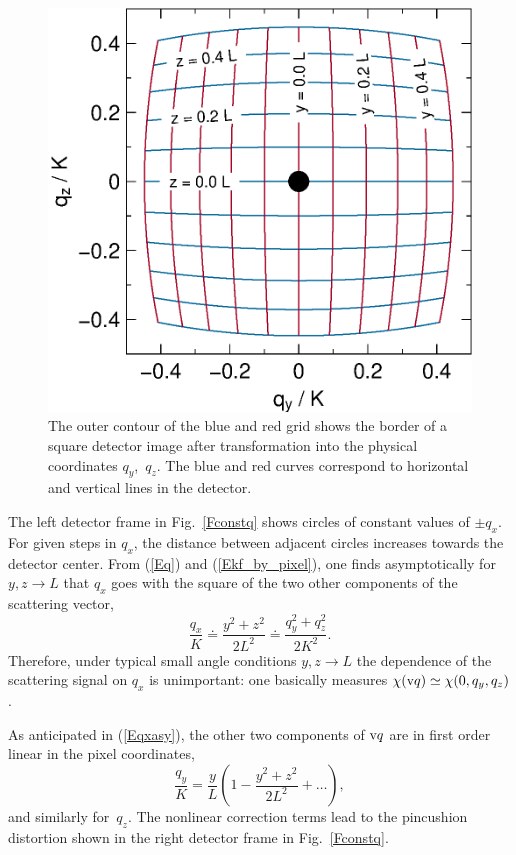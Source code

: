 \begin{figure}[t]
\begin{center}
\includegraphics[width=.47\textwidth]{fig/drawing/SAS_const_p_yz.ps}
\end{center}
\caption{The outer contour of the blue and red grid
shows the border of a square detector image 
after transformation into the physical coordinates $q_y$,~$q_z$.
The blue and red curves correspond to horizontal and vertical lines in the detector.}
\label{Fconstp}
\end{figure}

The left detector frame in Fig.~\ref{Fconstq}
shows circles of constant values of $\pm q_x$.
For given steps in $q_x$, the distance between adjacent circles
increases towards the detector center.
From (\ref{Eq}) and (\ref{Ekf_by_pixel}),
one finds asymptotically for $y,z\to L$
that $q_x$ goes with the square of the two other components of the scattering vector,
\begin{equation}\label{Eqxasy}
  \frac{q_x}{K}
  \doteq \frac{y^2+z^2}{2 L^2} 
  \doteq \frac{q_y^2 + q_z^2}{2K^2}.
\end{equation}
Therefore, under typical small angle conditions $y,z\to L$
the dependence of the scattering signal on $q_x$ is unimportant:
one basically measures $\chi(\text{v}{q})\simeq \chi(0,q_y,q_z)$.


As anticipated in (\ref{Eqxasy}),
the other two components of $\text{v}{q}$ are in first order linear in the pixel coordinates,
\begin{equation}
  \frac{q_y}{K}=\frac{y}{L}\left(1-\frac{y^2+z^2}{2L^2}+\ldots\right),
\end{equation}
and similarly for~$q_z$.
The nonlinear correction terms lead to the pincushion distortion 
shown in the right detector frame in Fig.~\ref{Fconstq}.
%
%
%

